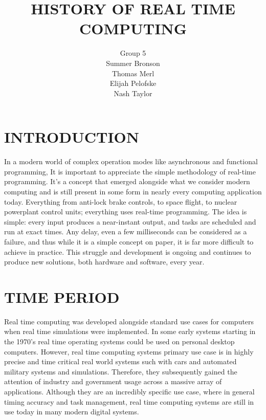 \documentclass[letterpaper, 10 pt]{IEEEconf}
\title{\LARGE \bf
HISTORY OF REAL TIME COMPUTING\\
}
\author{Group 5\\
\small Summer Bronson\\
\small Thomas Merl\\
\small Elijah Pelofske\\
\small Nash Taylor
}
\begin{document}
\maketitle
\thispagestyle{empty}
\pagestyle{empty}


\section{INTRODUCTION}

In a modern world of complex operation modes like asynchronous and functional programming, 
It is important to appreciate the simple methodology of real-time programming. It's a concept 
that emerged alongside what we consider modern computing and is still present in some form in nearly 
every computing application today. Everything from anti-lock brake controls, to space flight, to nuclear powerplant control units; 
everything uses real-time programming. The idea is simple: every input produces a near-instant output, and tasks are scheduled and 
run at exact times. Any delay, even a few milliseconds can be considered as a failure, and thus while it is a simple concept on paper, 
it is far more difficult to achieve in practice. This struggle and development is ongoing and continues to produce new solutions, both hardware and 
software, every year.

\section{TIME PERIOD}

Real time computing was developed alongside standard use cases for computers when real time simulations were implemented. In 
some early systems starting in the 1970's real time operating systems could be used on personal desktop computers. However, 
real time computing systems primary use case is in highly precise and time critical real world systems such with cars and 
automated military systems and simulations. Therefore, they subsequently gained the attention of industry and government 
usage across a massive array of applications. Although they are an incredibly specific use case, where in general timing 
accuracy and task management, real time computing systems are still in use today in many modern digital systems.

\end{document}

